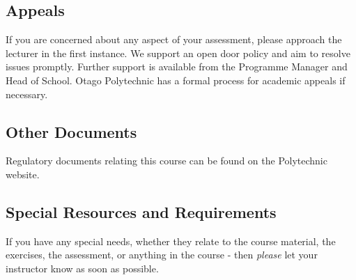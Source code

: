 \documentclass{article}
\begin{document}
\subsection*{Appeals}
If you are concerned about any aspect of your assessment, please approach the lecturer in the first instance.  We support
an open door policy and aim to resolve issues promptly.  Further support is available from the Programme
Manager and Head of School. Otago Polytechnic has a formal process for academic appeals if necessary.

\subsection*{Other Documents}
Regulatory documents relating this course can be found on the Polytechnic website.

\subsection*{Special Resources and Requirements}
If you have any special needs, whether they relate to the course material, the exercises, the assessment, or anything in the course -
then \textit{please} let your instructor know as soon as possible.
\end{document}

